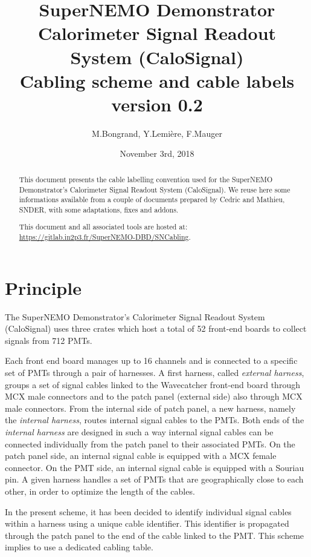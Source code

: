 \documentclass[12pt,a4paper]{article}
\title{SuperNEMO Demonstrator\\
  Calorimeter Signal Readout System (CaloSignal)\\
  Cabling scheme and cable labels\\
  version 0.2}
\author{M.Bongrand, Y.Lemi\`ere, F.Mauger}
\date{November 3rd, 2018}
\begin{document}
\maketitle

\begin{abstract}
  \noindent This document presents the cable labelling convention used
  for  the SuperNEMO  Demonstrator's Calorimeter Signal Readout  System
  (CaloSignal).  We reuse  here some informations available  from a couple
  of documents prepared  by Cedric and Mathieu, SNDER,  with some adaptations,
  fixes and addons.
  
  \vskip 10pt
  \noindent This document and all associated tools
  are hosted at:
  \vskip 5pt
  \url{https://gitlab.in2p3.fr/SuperNEMO-DBD/SNCabling}.

\end{abstract}

\tableofcontents
\vfill

\clearpage
\section{Principle}

The  SuperNEMO   Demonstrator's  Calorimeter  Signal   Readout  System
(CaloSignal)  uses three  crates which  host a  total of  52 front-end
boards to collect signals from 712 PMTs.

Each front end board  manages up to 16 channels and  is connected to a
specific set  of PMTs through a  pair of harnesses.  A  first harness,
called \emph{external harness},  groups a set of  signal cables linked
to the Wavecatcher front-end board  through MCX male connectors and to
the  patch panel  (external side)  also through  MCX male  connectors.
From  the internal side  of patch panel, a
new  harness,  namely  the \emph{internal  harness},  routes  internal
signal cables to  the PMTs.  Both ends of  the \emph{internal harness}
are designed in  such  a  way internal  signal  cables  can be  connected
individually from  the patch  panel to their  associated PMTs.  On the
patch panel  side, an  internal signal  cable is  equipped with  a MCX
female  connector.  On  the  PMT  side, an  internal  signal cable  is
equipped with  a Souriau pin.  A  given harness handles a  set of PMTs
that are geographically close to each  other, in order to optimize the
length of the cables.

In  the present  scheme, it  has been  decided to  identify individual
signal cables within a harness  using a unique cable identifier.  This
identifier is  propagated through the  patch panel  to the end  of the
cable  linked to  the PMT.   This scheme  implies to  use a  dedicated
cabling table.
\end{document}

